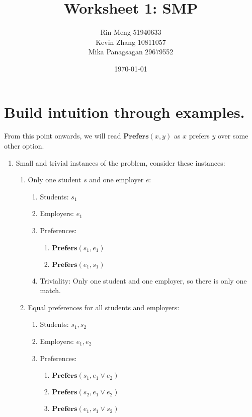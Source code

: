 \documentclass[12pt]{article}
\title{Worksheet 1: SMP}
\author{Rin Meng 51940633\\ Kevin Zhang 10811057\\ Mika Panagsagan 29679552}
\date{\today}
\begin{document}
\maketitle

\section{Build intuition through examples.}
    From this point onwards, we will read $\textbf{Prefers}(x, y)$ as $x$ prefers $y$ over some other option.

    \begin{enumerate}
        \item Small and trivial instances of the problem, consider these instances:
            \begin{enumerate}
                \item Only one student $s$ and one employer $e$:
                \begin{enumerate}[-]
                    \item Students: ${s_1}$
                    \item Employers: ${e_1}$
                    \item Preferences: 
                        \begin{enumerate}
                            \item $\textbf{Prefers}(s_1, e_1)$
                            \item $\textbf{Prefers}(e_1, s_1)$
                        \end{enumerate}
                    \item Triviality: Only one student and one employer, so there is only one match.
                \end{enumerate}
                \item Equal preferences for all students and employers:
                \begin{enumerate}
                    \item Students: ${s_1, s_2}$
                    \item Employers: ${e_1, e_2}$
                    \item Preferences:
                        \begin{enumerate}
                            \item $\textbf{Prefers}(s_1, e_1 \lor e_2)$
                            \item $\textbf{Prefers}(s_2, e_1 \lor e_2)$
                            \item $\textbf{Prefers}(e_1, s_1 \lor s_2)$

\end{enumerate}
\end{enumerate}
\end{enumerate}
\end{enumerate}
\end{document}
